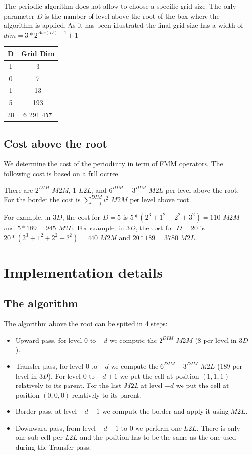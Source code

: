 \documentclass[12pt]{article} %
\begin{document}
The periodic-algorithm does not allow to choose a specific grid size.
The only parameter $D$ is the number of level above the root of the box where the algorithm is applied.
As it has been illustrated the final grid size has a width of $dim = 3*2^{Abs(D)+1} + 1$

\begin{center}
\begin{tabular}{ | c | c | }
 \hline                 
   D & Grid Dim \\ \hline
   1 & 3 \\
   0 & 7 \\
   1 & 13 \\
   5 & 193 \\
   20 & 6 291 457 \\
 \hline  
 \end{tabular}
\end{center}

\subsection{Cost above the root}
We determine the cost of the periodicity in term of FMM operators.
The following cost is based on a full octree.

There are $2^{DIM}$ $M2M$, $1$ $L2L$, and $6^{DIM}-3^{DIM}$ $M2L$ per level above the root.
For the border the cost is $\sum_{i=1}^{DIM}{i^2}$ $M2M$ per level above root.

For example, in $3D$, the cost for $D=5$ is $5*(2^3 + 1^2 + 2^2 + 3^2) = 110$ $M2M$ and $5*189 = 945$ $M2L$.
For example, in $3D$, the cost for $D=20$ is $20*(2^3 + 1^2 + 2^2 + 3^2) = 440$ $M2M$ and $20*189 = 3780$ $M2L$.


\section{Implementation details}

\subsection{The algorithm}

The algorithm above the root can be spited in 4 steps:
\begin{itemize}
\item Upward pass, for level $0$ to $-d$ we compute the $2^{DIM}$ $M2M$ ($8$ per level in $3D$).
\item Transfer pass, for level $0$ to $-d$ we compute the $6^{DIM}-3^{DIM}$ $M2L$ ($189$ per level in $3D$).
For level $0$ to $-d+1$ we put the cell at position $(1,1,1)$ relatively to its parent.
For the last $M2L$ at level $-d$ we put the cell at position $(0,0,0)$ relatively to its parent. 
\item Border pass, at level $-d-1$ we compute the border and apply it using $M2L$.
\item Downward pass, from level $-d-1$ to $0$ we perform one $L2L$.
There is only one sub-cell per $L2L$ and the position has to be the same as the one used during the Transfer pass.
\end{itemize}
\end{document}
